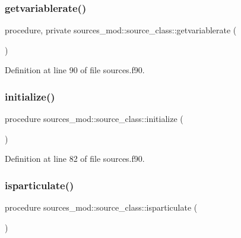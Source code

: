 \subsubsection{\texorpdfstring{getvariablerate()}{getvariablerate()}}
{\footnotesize\ttfamily procedure, private sources\+\_\+mod\+::source\+\_\+class\+::getvariablerate (\begin{DoxyParamCaption}{ }\end{DoxyParamCaption})\hspace{0.3cm}{\ttfamily [private]}}



Definition at line 90 of file sources.\+f90.

\mbox{\label{structsources__mod_1_1source__class_a996650639d039c09d2b77a36473e977e}} 
\subsubsection{\texorpdfstring{initialize()}{initialize()}}
{\footnotesize\ttfamily procedure sources\+\_\+mod\+::source\+\_\+class\+::initialize (\begin{DoxyParamCaption}{ }\end{DoxyParamCaption})\hspace{0.3cm}{\ttfamily [private]}}



Definition at line 82 of file sources.\+f90.

\mbox{\label{structsources__mod_1_1source__class_aa0577157bf75a525f9e1bde905500ab7}} 
\subsubsection{\texorpdfstring{isparticulate()}{isparticulate()}}
{\footnotesize\ttfamily procedure sources\+\_\+mod\+::source\+\_\+class\+::isparticulate (\begin{DoxyParamCaption}{ }\end{DoxyParamCaption})\hspace{0.3cm}{\ttfamily [private]}}



